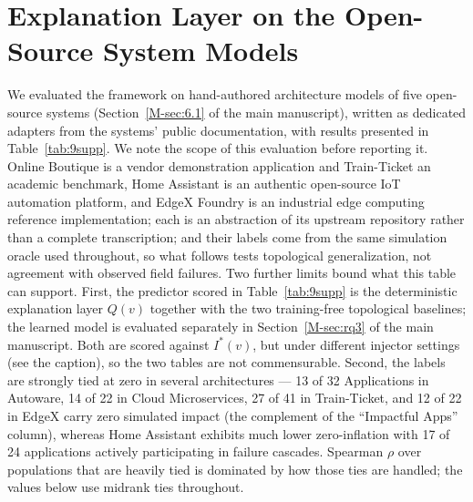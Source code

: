 \documentclass[preprint,3p]{elsarticle}
\begin{document}
\section{Explanation Layer on the Open-Source System Models}
\label{supp:rq4}

We evaluated the framework on hand-authored architecture models of five open-source systems (Section~\ref{M-sec:6.1} of the main manuscript), written as dedicated adapters from the systems' public documentation, with results presented in Table~\ref{tab:9supp}. We note the scope of this evaluation before reporting it. Online Boutique is a vendor demonstration application and Train-Ticket an academic benchmark, Home Assistant is an authentic open-source IoT automation platform, and EdgeX Foundry is an industrial edge computing reference implementation; each is an abstraction of its upstream repository rather than a complete transcription; and their labels come from the same simulation oracle used throughout, so what follows tests topological generalization, not agreement with observed field failures. Two further limits bound what this table can support. First, the predictor scored in Table~\ref{tab:9supp} is the deterministic explanation layer $Q(v)$ together with the two training-free topological baselines; the learned model is evaluated separately in Section~\ref{M-sec:rq3} of the main manuscript. Both are scored against $I^*(v)$, but under different injector settings (see the caption), so the two tables are not commensurable. Second, the labels are strongly tied at zero in several architectures --- 13 of 32 Applications in Autoware, 14 of 22 in Cloud Microservices, 27 of 41 in Train-Ticket, and 12 of 22 in EdgeX carry zero simulated impact (the complement of the ``Impactful Apps'' column), whereas Home Assistant exhibits much lower zero-inflation with 17 of 24 applications actively participating in failure cascades. Spearman $\rho$ over populations that are heavily tied is dominated by how those ties are handled; the values below use midrank ties throughout.
\end{document}
